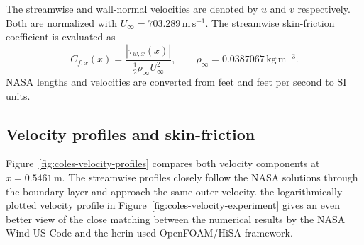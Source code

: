 The streamwise and wall-normal velocities are denoted by \(u\) and \(v\) respectively.
Both are normalized with \(U_\infty=703.289\,\mathrm{m\,s^{-1}}\). The streamwise skin-friction
coefficient is evaluated as
\begin{equation}
    C_{f,x}(x)=\frac{|\tau_{w,x}(x)|}
        {\tfrac12\rho_\infty U_\infty^2},
    \qquad \rho_\infty=0.0387067\,\mathrm{kg\,m^{-3}}.
    \label{eq:coles-skin-friction}
\end{equation}
NASA lengths and velocities are converted from feet and feet per
second to SI units.

\subsection{Velocity profiles and skin-friction}
\label{subsec:coles-results}

Figure~\ref{fig:coles-velocity-profiles} compares both velocity components
at \(x=0.5461\,\mathrm{m}\). The streamwise profiles closely follow
the NASA solutions through the boundary layer and approach the same outer
velocity. the logarithmically plotted velocity profile in Figure~\ref{fig:coles-velocity-experiment} gives an even better view of the close matching between the numerical results by the NASA Wind-US Code and the herin used OpenFOAM/HiSA framework.

